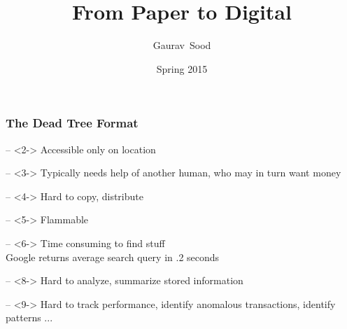 \documentclass[compress, black]{beamer}
\title[DS]{From Paper to Digital}
\author[Sood]{Gaurav~Sood}
\date[2015]{Spring 2015}
\begin{document}
\newcommand{\multilineR}[1]{\begin{tabular}[b]{@{}r@{}}#1\end{tabular}}
\newcommand{\multilineL}[1]{\begin{tabular}[b]{@{}l@{}}#1\end{tabular}}
\newcommand{\multilineC}[1]{\begin{tabular}[b]{@{}c@{}}#1\end{tabular}}

\newenvironment{large_enum}{
\Large
\begin{itemize}
  \setlength{\itemsep}{7pt}
  \setlength{\parskip}{0pt}
  \setlength{\parsep}{0pt}
}{\end{itemize}}

\begin{comment}

	setwd(paste0(basedir, "github/data-science/app/"))
	tools::texi2dvi("PaperToDigital.tex", pdf=TRUE,clean=TRUE)
	setwd(basedir)

\end{comment}

 \frame
  {
    \titlepage
  }

\begin{frame}
\frametitle{}
\end{frame}

\begin{frame}
\frametitle{The Dead Tree Format}
	\begin{large_enum}
		\item[--]<2-> Accessible only on location
		\item[--]<3-> Typically needs help of another human, who may in turn want \alert{money} 
		\item[--]<4-> Hard to copy, distribute
		\item[--]<5-> Flammable
		\item[--]<6-> Time consuming to find stuff \\ \normalsize \pause \pause \pause \pause \pause \pause 
					  Google returns average search query in .2 seconds
		\item[--]<8-> Hard to analyze, summarize stored information
		\item[--]<9-> Hard to track performance, identify anomalous transactions, identify patterns ...
 	\end{large_enum}
\end{frame}
\end{document}
